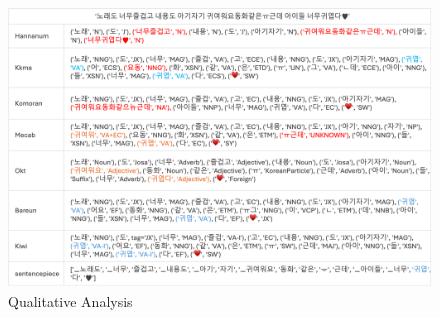 \documentclass{article}
\begin{document}
\begin{figure}
        \centering
        \includegraphics[width=1\linewidth]{comparison.png}
        \caption{Qualitative Analysis}
        \label{fig:enter-label}
\end{figure}
\end{document}
